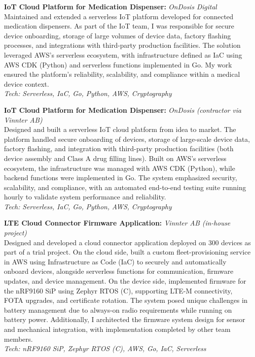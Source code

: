\textbf{IoT Cloud Platform for Medication Dispenser:} \textit{OnDosis Digital} \\
Maintained and extended a serverless IoT platform developed for connected medication dispensers. As part of the IoT team, I was responsible for secure device onboarding, storage of large volumes of device data, factory flashing processes, and integrations with third-party production facilities. The solution leveraged AWS’s serverless ecosystem, with infrastructure defined as IaC using AWS CDK (Python) and serverless functions implemented in Go. My work ensured the platform’s reliability, scalability, and compliance within a medical device context. \\
\textit{Tech: Serverless, IaC, Go, Python, AWS, Cryptography} \\
\SmallSep



\SmallSep
\textbf{IoT Cloud Platform for Medication Dispenser:} \textit{OnDosis (contractor via Vinnter AB)} \\
Designed and built a serverless IoT cloud platform from idea to market. The platform handled secure onboarding of devices, storage of large-scale device data, factory flashing, and integration with third-party production facilities (both device assembly and Class A drug filling lines). Built on AWS’s serverless ecosystem, the infrastructure was managed with AWS CDK (Python), while backend functions were implemented in Go. The system emphasized security, scalability, and compliance, with an automated end-to-end testing suite running hourly to validate system performance and reliability. \\
\textit{Tech: Serverless, IaC, Go, Python, AWS, Cryptography} \\
\SmallSep

\textbf{LTE Cloud Connector Firmware Application:} \textit{Vinnter AB (in-house project)} \\
Designed and developed a cloud connector application deployed on 300 devices as part of a trial project. On the cloud side, built a custom fleet-provisioning service in AWS using Infrastructure as Code (IaC) to securely and automatically onboard devices, alongside serverless functions for communication, firmware updates, and device management. On the device side, implemented firmware for the nRF9160 SiP using Zephyr RTOS (C), supporting LTE-M connectivity, FOTA upgrades, and certificate rotation. The system posed unique challenges in battery management due to always-on radio requirements while running on battery power. Additionally, I architected the firmware system design for sensor and mechanical integration, with implementation completed by other team members. \\
\textit{Tech: nRF9160 SiP, Zephyr RTOS (C), AWS, Go, IaC, Serverless} \\
\SmallSep

